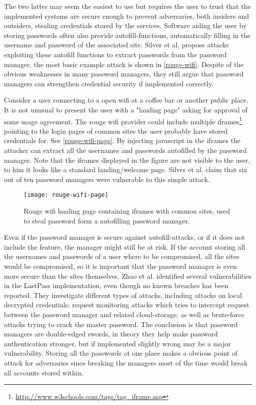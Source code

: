 The two latter may seem the easiest to use but requires the user to trust that the implemented systems are secure enough to prevent adversaries, both insiders and outsiders, stealing credentials stored by the services. Software aiding the user by storing passwords often also provide autofill-functions, automatically filling in the username and password of the associated site. Silver et al. \cite{pw-managment-attacks} propose attacks exploiting these autofill functions to extract passwords from the password manager, the most basic example attack is shown in \autoref{rouge-wifi}. Despite of the obvious weaknesses in many password managers, they still argue that password managers can strengthen credential security if implemented correctly.  
\begin{example}\label{rouge-wifi}
    Consider a user connecting to a open wifi at a coffee bar or another public place. It is not unusual to present the user with a "landing page" asking for approval of some usage agreement. The rouge wifi provider could include multiple iframes\footnote{\url{http://www.w3schools.com/tags/tag_iframe.asp}} pointing to the login pages of common sites the user probably have stored credentials for. See \autoref{rouge-wifi-page}. By injecting javascript in the iframes the attacker can extract all the usernames and passwords autofilled by the password manager. Note that the iframes displayed in the figure are not visible to the user, to him it looks like a standard landing/welcome page. Silver et al. \cite{pw-managment-attacks} claim that six out of ten password managers were vulnerable to this simple attack.


\begin{figure}
    \texttt{[image: rouge-wifi-page]}
    \caption{Rouge wifi landing page containing iframes with common sites, used to steal password form a autofilling password manager.} 
    \label{rouge-wifi-page}
\end{figure}

\end{example}

\par Even if the password manager is secure against autofill-attacks, or if it does not include the feature, the manager might still be at risk. If the account storing all the usernames and passwords of a user where to be compromised, all the sites would be compromised, so it is important that the password manager is even more secure than the sites themselves. Zhao et al. \cite{lastpass-security} identified several vulnerabilities in the LastPass implementation, even though no known breaches has been reported. They investigate different types of attacks, including attacks on local decrypted credentials; request monitoring attacks which tries to intercept request between the password manager and related cloud-storage; as well as brute-force attacks trying to crack the master password. The conclusion is that password managers are double-edged swords, in theory they help make password authentication stronger, but if implemented slightly wrong may be a major vulnerability. Storing all the passwords at one place makes a obvious point of attack for adversaries since breaking the managers most of the time would break all accounts stored within.


